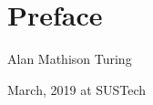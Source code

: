 \chapter{Preface}
\label{chap:chap-preface}
\vskip 28pt

\begin{flushright}

Alan Mathison Turing

March, 2019 at SUSTech

\end{flushright}






     